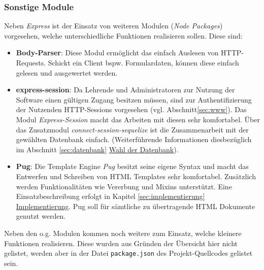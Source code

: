 \subsubsection{Sonstige Module}
Neben \emph{Express} ist der Einsatz von weiteren Modulen (\emph{Node Packages}) vorgesehen, welche unterschiedliche Funktionen realisieren sollen. Diese sind:
\begin{itemize}
	\item \textbf{Body-Parser}: Diese Modul ermöglicht das einfach Auslesen von HTTP-Requests. Schickt ein Client bspw. Formulardaten, können diese einfach gelesen und ausgewertet werden. 
	\item \textbf{express-session}: Da Lehrende und Administratoren zur Nutzung der Software einen gültigen Zugang besitzen müssen, sind zur Authentifizierung der Nutzenden HTTP-Sessions vorgesehen (vgl.  Abschnitt\ref{sec:www}). Das Modul \emph{Express-Session} macht das Arbeiten mit diesen sehr komfortabel. Über das Zusatzmodul \emph{connect-session-sequelize} ist die Zusammenarbeit mit der gewählten Datenbank einfach. (Weiterführende Informationen diesbezüglich im Abschnitt \ref{sec:datenbank} \hyperref[sec:datenbank]{Wahl der Datenbank}). 
	\item \textbf{Pug}: Die Template Engine \emph{Pug} besitzt seine eigene Syntax und macht das Entwerfen und Schreiben von HTML Templates sehr komfortabel. Zusätzlich werden Funktionalitäten wie Vererbung und Mixins unterstützt. Eine Einsatzbeschreibung erfolgt in Kapitel \ref{sec:implementierung} \hyperref[sec:implementierung]{Implementierung}. Pug soll für sämtliche zu übertragende HTML Dokumente genutzt werden.   
\end{itemize}

Neben den o.g. Modulen kommen noch weitere zum Einsatz, welche kleinere Funktionen realisieren. Diese wurden aus Gründen der Übersicht hier nicht gelistet, werden aber in der Datei \texttt{package.json} des Projekt-Quellcodes gelistet sein.
